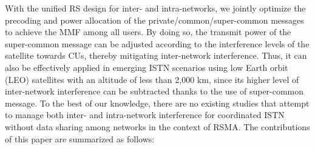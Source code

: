 \documentclass[draftclsnofoot, onecolumn, comsoc, 12pt]{IEEEtran}
\begin{document}
With the unified RS design for inter- and intra-networks, we jointly optimize the precoding and power allocation of the private/common/super-common messages to achieve the MMF among all users.
By doing so, the transmit power of the super-common message can be adjusted according to the interference levels of the satellite towards CUs, thereby  mitigating inter-network interference. 
{Thus, it can also be effectively applied in emerging ISTN scenarios using low Earth orbit (LEO) satellites with an altitude of less than 2,000 km, since its higher level of inter-network interference can be subtracted thanks to the use of super-common message.}
To the best of our knowledge, there are no existing studies that attempt to manage both inter- and intra-network interference for coordinated ISTN without data sharing among networks in the context of RSMA. 
The contributions of this paper are summarized as follows:
\end{document}
